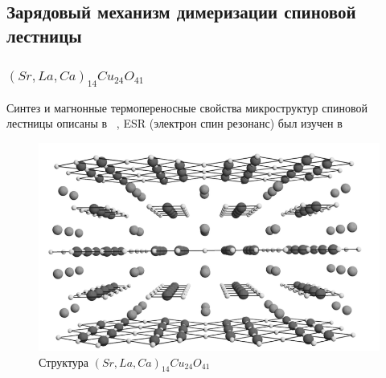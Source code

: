 \documentclass[11pt]{article}
\begin{document}
\subsection{Зарядовый механизм димеризации спиновой лестницы}

\subsubsection{$(Sr,La,Ca)_{14}Cu_{24}O_{41}$}
Синтез и магнонные термопереносные свойства микроструктур спиновой лестницы описаны в ~\cite{adfm_202001637}, ESR (электрон спин резонанс) был изучен в ~\cite{kataev2002}

\begin{figure}[htp]
\centering
\includegraphics[scale=0.5]{Sr_14_Cu_24_O_41_a}
\caption{Структура $(Sr,La,Ca)_{14}Cu_{24}O_{41}$ ~\cite{ishii2010}}
\label{}
\end{figure}
\end{document}

